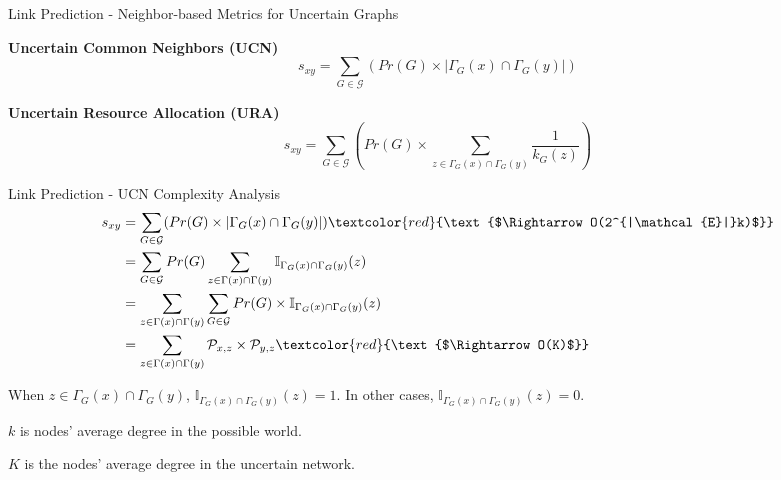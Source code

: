 \documentclass[9pt]{beamer}
\begin{document}
\begin{frame}{Link Prediction - Neighbor-based Metrics for Uncertain Graphs}

\textbf{Uncertain Common Neighbors (UCN)}
\begin{equation}
s_{xy}=\sum_{G\in \mathcal{G}}( Pr(G)\times|\Gamma_G(x)\cap\Gamma_G(y)|)
\end{equation}

\textbf{Uncertain Resource Allocation (URA)}
\begin{equation}
s_{xy}=\sum_{G\in \mathcal{G}}( Pr(G)\times\sum_{z\in \Gamma_G(x)\cap\Gamma_G(y)}\frac{1}{k_G(z)})
\end{equation}

\end{frame}

\begin{frame}{Link Prediction - UCN Complexity Analysis}
\begin{align*}
s_{xy}&=\sum_{G\in \mathcal{G}}( Pr(G)\times|\Gamma_G(x)\cap\Gamma_G(y)|) \textcolor{red}{\text{$\Rightarrow O(2^{|\mathcal{E}|}k)$}}\\
&=\sum_{G\in \mathcal{G}}Pr(G)\sum_{z\in \Gamma(x)\cap\Gamma(y)}\mathbb{I}_{\Gamma_G(x)\cap\Gamma_G(y)}(z)\\
&=\sum_{z\in \Gamma(x)\cap\Gamma(y)}\sum_{G\in \mathcal{G}}Pr(G)\times\mathbb{I}_{\Gamma_G(x)\cap\Gamma_G(y)}(z)\\
&=\sum_{z\in \Gamma(x)\cap\Gamma(y)}\mathcal{P}_{x,z}\times\mathcal{P}_{y,z} \textcolor{red}{\text{$\Rightarrow O(K)$}}
\end{align*}

When $z\in \Gamma_G(x)\cap\Gamma_G(y)$, $\mathbb{I}_{\Gamma_G(x)\cap\Gamma_G(y)}(z)=1$. In other cases, $\mathbb{I}_{\Gamma_G(x)\cap\Gamma_G(y)}(z)=0$.

$k$ is nodes' average degree in the possible world.

$K$ is the nodes' average degree in the uncertain network.
\end{frame}
\end{document}
